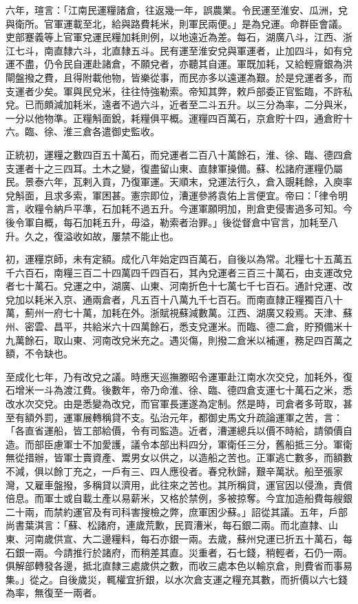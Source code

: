 六年，瑄言：「江南民運糧諸倉，往返幾一年，誤農業。令民運至淮安、瓜洲，兌與衛所。官軍運載至北，給與路費耗米，則軍民兩便。」是為兌運。命群臣會議。吏部蹇義等上官軍兌運民糧加耗則例，以地遠近為差。每石，湖廣八斗，江西、浙江七斗，南直隸六斗，北直隸五斗。民有運至淮安兌與軍運者，止加四斗，如有兌運不盡，仍令民自運赴諸倉，不願兌者，亦聽其自運。軍既加耗，又給輕齎銀為洪閘盤撥之費，且得附載他物，皆樂從事，而民亦多以遠運為艱。於是兌運者多，而支運者少矣。軍與民兌米，往往恃強勒索。帝知其弊，敕戶部委正官監臨，不許私兌。已而頗減加耗米，遠者不過六斗，近者至二斗五升。以三分為率，二分與米，一分以他物準。正糧斛面銳，耗糧俱平概。運糧四百萬石，京倉貯十四，通倉貯十六。臨、徐、淮三倉各遣御史監收。

正統初，運糧之數四百五十萬石，而兌運者二百八十萬餘石，淮、徐、臨、德四倉支運者十之三四耳。土木之變，復盡留山東、直隸軍操備。蘇、松諸府運糧仍屬民。景泰六年，瓦剌入貢，乃復軍運。天順末，兌運法行久，倉入覬耗餘，入庾率兌斛面，且求多索，軍困甚。憲宗即位，漕運參將袁佑上言便宜。帝曰：「律令明言，收糧令納戶平準，石加耗不過五升。今運軍願明加，則倉吏侵害過多可知。今後令軍自概，每石加耗五升，毋溢，勒索者治罪。」後從督倉中官言，加耗至八升。久之，復溢收如故，屢禁不能止也。

初，運糧京師，未有定額。成化八年始定四百萬石，自後以為常。北糧七十五萬五千六百石，南糧三百二十四萬四千四百石，其內兌運者三百三十萬石，由支運改兌者七十萬石。兌運之中，湖廣、山東、河南折色十七萬七千七百石。通計兌運、改兌加以耗米入京、通兩倉者，凡五百十八萬九千七百石。而南直隸正糧獨百八十萬，薊州一府七十萬，加耗在外。浙賦視蘇減數萬。江西、湖廣又殺焉。天津、蘇州、密雲、昌平，共給米六十四萬餘石，悉支兌運米。而臨、德二倉，貯預備米十九萬餘石，取山東、河南改兌米充之。遇災傷，則撥二倉米以補運，務足四百萬之額，不令缺也。

至成化七年，乃有改兌之議。時應天巡撫滕昭令運軍赴江南水次交兌，加耗外，復石增米一斗為渡江費。後數年，帝乃命淮、徐、臨、德四倉支運七十萬石之米，悉改水次交兌。由是悉變為改兌，而官軍長運遂為定制。然是時，司倉者多苛取，甚至有額外罰，運軍展轉稱貸不支。弘治元年，都御史馬文升疏論運軍之苦，言：「各直省運船，皆工部給價，令有司監造。近者，漕運總兵以價不時給，請領價自造。而部臣慮軍士不加愛護，議令本部出料四分，軍衛任三分，舊船抵三分。軍衛無從措辦，皆軍士賣資產、鬻男女以供之，以造船之苦也。正軍逃亡數多，而額數不減，俱以餘丁充之，一戶有三、四人應役者。春兌秋歸，艱辛萬狀。船至張家灣，又雇車盤撥，多稱貸以濟用，此往來之苦也。其所稱貸，運官因以侵漁，責償倍息。而軍士或自載土產以易薪米，又格於禁例，多被掠奪。今宜加造船費每艘銀二十兩，而禁約運官及有司科害搜檢之弊，庶軍困少蘇。」詔從其議。五年，戶部尚書葉淇言：「蘇、松諸府，連歲荒歉，民買漕米，每石銀二兩。而北直隸、山東、河南歲供宣、大二邊糧料，每石亦銀一兩。去歲，蘇州兌運已折五十萬石，每石銀一兩。今請推行於諸府，而稍差其直。災重者，石七錢，稍輕者，石仍一兩。俱解部轉發各邊，抵北直隸三處歲供之數，而收三處本色以輸京倉，則費省而事易集。」從之。自後歲災，輒權宜折銀，以水次倉支運之糧充其數，而折價以六七錢為率，無復至一兩者。

